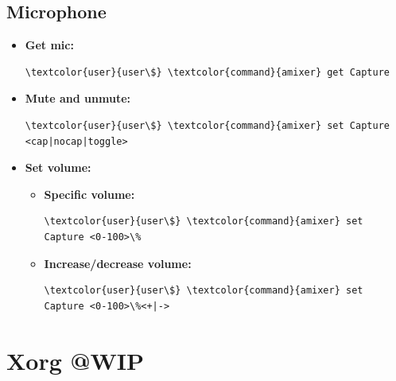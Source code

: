 \documentclass[10pt, a4paper, onecolumn, oneside, titlepage, openany]{book}
\begin{document}
\section{Microphone}
\begin{itemize}
    \item \textbf{Get mic:}
\begin{Verbatim}[commandchars=\\\{\}]
\textcolor{user}{user\$} \textcolor{command}{amixer} get Capture
\end{Verbatim}
    \item \textbf{Mute and unmute:}
\begin{Verbatim}[commandchars=\\\{\}]
\textcolor{user}{user\$} \textcolor{command}{amixer} set Capture <cap|nocap|toggle>
\end{Verbatim}
    \item \textbf{Set volume:}
    \begin{itemize}
        \item \textbf{Specific volume:}
\begin{Verbatim}[commandchars=\\\{\}]
\textcolor{user}{user\$} \textcolor{command}{amixer} set Capture <0-100>\%
\end{Verbatim}        
        \item \textbf{Increase/decrease volume:}
\begin{Verbatim}[commandchars=\\\{\}]
\textcolor{user}{user\$} \textcolor{command}{amixer} set Capture <0-100>\%<+|->
\end{Verbatim}   
    \end{itemize}
\end{itemize}


\chapter{Xorg @WIP}
\end{document}
